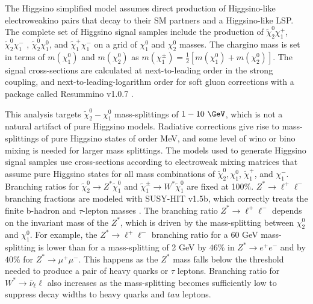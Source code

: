 The Higgsino simplified model assumes direct production of Higgsino-like electroweakino pairs that decay to their SM partners and a Higgsino-like LSP.  The complete set of Higgsino signal samples include the production of $\tilde\chi_2^0\chi_1^+$, $\tilde\chi_2^0\chi_1^-$ , $\tilde\chi_2^0\chi_1^0$, and $\tilde\chi_1^+\chi_1^-$ on a grid of $\chi_1^0$ and $\chi_2^0$ masses.  The chargino mass is set in terms of $m(\chi_1^0)$ and $m(\chi_2^0)$ as $m(\chi_1^\pm)=\frac{1}{2}[m(\chi_1^0)+m(\chi_2^0)]$.  The signal cross-sections are calculated at next-to-leading order in the strong coupling, and next-to-leading-logarithm order for soft gluon corrections with a package called Resummino v1.0.7 \cite{fuks, klasen}.

This analysis targets $\tilde\chi_2^0-\chi_1^0$ mass-splittings of $1-10~\GeV$, which is not a natural artifact of pure Higgsino models.  Radiative corrections give rise to mass-splittings of pure Higgsino states of order MeV, and some level of wino or bino mixing is needed for larger mass splittings.  The models used to generate Higgsino signal samples use cross-sections according to electroweak mixing matrices that assume pure Higgsino states for all mass combinations of $\tilde\chi_2^0, \chi_1^0$, $\tilde\chi_1^+$, and $\chi_1^-$.  
Branching ratios for $\tilde\chi_2^0 \rightarrow Z^*\tilde\chi_1^0$ and $\tilde\chi_1^\pm \rightarrow W^* \tilde\chi_1^0$ are fixed at 100\%.  $Z^*\rightarrow \ell^+\ell^-$ branching fractions are modeled with SUSY-HIT v1.5b, which correctly treats the finite b-hadron and $\tau$-lepton masses \cite{spira}.  
The branching ratio $Z^* \rightarrow \ell^+\ell^-$ depends on the invariant mass of the $Z^*$, which is driven by the mass-splitting between $\chi^0_2$ and $\chi^0_1$.  For example, the $Z^* \rightarrow \ell^+\ell^-$ branching ratio for a 60 GeV mass-splitting is lower than for a mass-splitting of 2 GeV by  $46\%$ in $Z^* \rightarrow e^+e^-$ and by $40\%$ for $Z^* \rightarrow \mu^+\mu^-$.  This happens as the $Z^*$ mass falls below the threshold needed to produce a pair of heavy quarks or $\tau$ leptons.  Branching ratio for $W^* \rightarrow \bar{\nu}_\ell \ell$ also increases as the mass-splitting becomes sufficiently low to suppress decay widths to heavy quarks and $tau$ leptons. %

